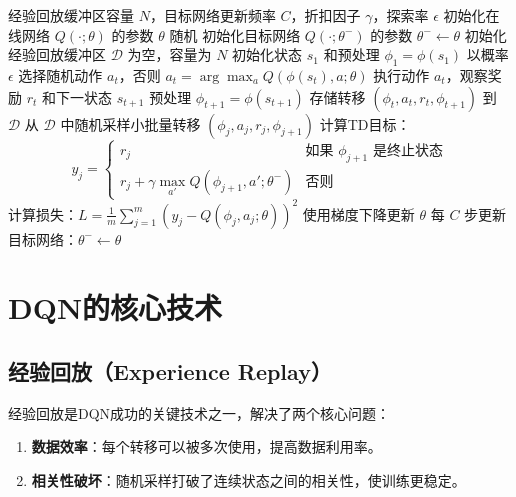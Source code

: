 \begin{algorithm}[H]
\caption{深度Q网络（DQN）算法}
\begin{algorithmic}[1]
\REQUIRE 经验回放缓冲区容量 $N$，目标网络更新频率 $C$，折扣因子 $\gamma$，探索率 $\epsilon$
\STATE 初始化在线网络 $Q(\cdot; \theta)$ 的参数 $\theta$ 随机
\STATE 初始化目标网络 $Q(\cdot; \theta^-)$ 的参数 $\theta^- \leftarrow \theta$
\STATE 初始化经验回放缓冲区 $\mathcal{D}$ 为空，容量为 $N$
    \STATE 初始化状态 $s_1$ 和预处理 $\phi_1 = \phi(s_1)$
        \STATE 以概率 $\epsilon$ 选择随机动作 $a_t$，否则 $a_t = \arg\max_{a} Q(\phi(s_t), a; \theta)$
        \STATE 执行动作 $a_t$，观察奖励 $r_t$ 和下一状态 $s_{t+1}$
        \STATE 预处理 $\phi_{t+1} = \phi(s_{t+1})$
        \STATE 存储转移 $(\phi_t, a_t, r_t, \phi_{t+1})$ 到 $\mathcal{D}$
        \STATE 从 $\mathcal{D}$ 中随机采样小批量转移 $(\phi_j, a_j, r_j, \phi_{j+1})$
        \STATE 计算TD目标：
        \[
        y_j = \begin{cases}
        r_j & \text{如果 } \phi_{j+1} \text{ 是终止状态} \\
        r_j + \gamma \max_{a'} Q(\phi_{j+1}, a'; \theta^-) & \text{否则}
        \end{cases}
        \]
        \STATE 计算损失：$L = \frac{1}{m} \sum_{j=1}^{m} (y_j - Q(\phi_j, a_j; \theta))^2$
        \STATE 使用梯度下降更新 $\theta$
        \STATE 每 $C$ 步更新目标网络：$\theta^- \leftarrow \theta$
    \ENDFOR
\ENDFOR
\end{algorithmic}
\end{algorithm}

\section{DQN的核心技术}

\subsection{经验回放（Experience Replay）}

经验回放是DQN成功的关键技术之一，解决了两个核心问题：

\begin{enumerate}
    \item \textbf{数据效率}：每个转移可以被多次使用，提高数据利用率。
    \item \textbf{相关性破坏}：随机采样打破了连续状态之间的相关性，使训练更稳定。
\end{enumerate}

